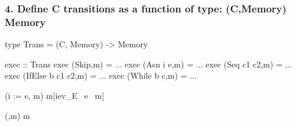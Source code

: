 \documentclass{beamer}
\begin{document}
\begin{frame}[fragile]
\frametitle{4. Define C transitions as a function of type: \<(C,Memory) \ra Memory\>}

\begin{smallcode}
type Trans  = (C, Memory) -> Memory

exec :: Trans
exec (Skip,m)            = ...
exec (Asn i e,m)        = ...
exec (Seq c1 c2,m)      = ...
exec (IfElse b c1 c2,m) = ...
exec (While b c,m)      = ...
\end{smallcode}

{\tiny
\begin{minipage}{1in}
\begin{haskell}
(i := e, m) \ra m[i\mapsto ev_E ~e ~m]
\end{haskell}
\end{minipage}
\begin{minipage}{1in}
\begin{haskell}
(,m) \ra m
\end{haskell}
\end{minipage}

\begin{minipage}{1in}
\begin{haskell}
\end{haskell}
\end{minipage}
\begin{minipage}{1in}
\begin{haskell}
\end{haskell}
\end{minipage}
\begin{center}
\begin{minipage}{1in}
\begin{haskell}
\end{haskell}
\end{minipage}
\begin{minipage}{1in}
\begin{haskell}
\end{haskell}
\end{minipage}
\end{center}
}
\end{frame}
\end{document}
